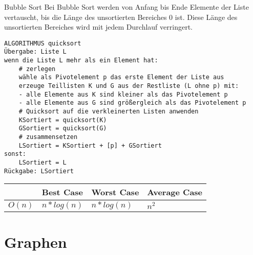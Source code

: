 \begin{zitat}{Bubble Sort}
Bei Bubble Sort werden von Anfang bis Ende Elemente der Liste vertauscht, bis die Länge des unsortierten Bereiches 0 ist. Diese Länge des unsortierten Bereiches wird mit jedem Durchlauf verringert.
\end{zitat}
\begin{lstlisting}
ALGORITHMUS quicksort
Übergabe: Liste L
wenn die Liste L mehr als ein Element hat:
    # zerlegen
    wähle als Pivotelement p das erste Element der Liste aus
    erzeuge Teillisten K und G aus der Restliste (L ohne p) mit:
    - alle Elemente aus K sind kleiner als das Pivotelement p
    - alle Elemente aus G sind größergleich als das Pivotelement p
    # Quicksort auf die verkleinerten Listen anwenden
    KSortiert = quicksort(K)
    GSortiert = quicksort(G)
    # zusammensetzen
    LSortiert = KSortiert + [p] + GSortiert
sonst:
    LSortiert = L
Rückgabe: LSortiert
\end{lstlisting}
\begin{table}[h]
\label{tab:my-table}
\begin{tabular}{l|l|l|l|}
\cline{2-4}
                             & Best Case & Worst Case & Average Case \\ \hline
\multicolumn{1}{|l|}{$O(n)$} & $n* log(n)$     & $n * log(n)$      & $n^2$        \\ \hline
\end{tabular}
\end{table}

\section{Graphen}
